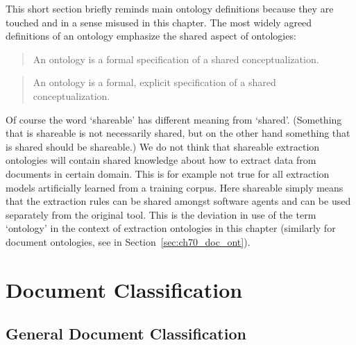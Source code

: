 This short section briefly reminds main ontology definitions because they are touched and in a sense misused in this chapter. The most widely agreed definitions of an ontology emphasize the shared aspect of ontologies: 
\begin{quote}
An ontology is a formal specification of a shared conceptualization.	\citep{so17864}
\end{quote}

\begin{quote}
An ontology is a formal, explicit specification of a shared conceptualization. \citep{Studer1998161}
\end{quote}

Of course the word `shareable' has different meaning from `shared'. (Something that is shareable is not necessarily shared, but on the other hand something that is shared should be shareable.) We do not think that shareable extraction ontologies will contain shared knowledge about how to extract data from documents in certain domain. This is for example not true for all extraction models artificially learned from a training corpus. Here shareable simply means that the extraction rules can be shared amongst software agents and can be used separately from the original tool. This is the deviation in use of the term `ontology' in the context of extraction ontologies in this chapter (similarly for document ontologies, see in Section~\ref{sec:ch70_doc_ont}).






\section{Document Classification} \label{sec:relwork_doc_classification}  \label{sec:ch20_doc_classification}

\subsection{General Document Classification}

